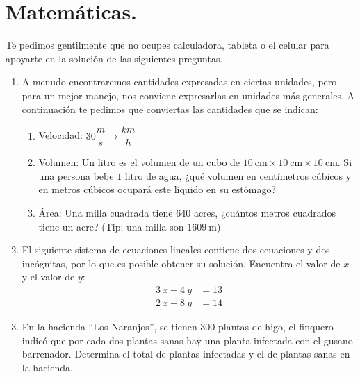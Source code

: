 \documentclass[12pt]{article}
\begin{document}
\section{Matemáticas.}
Te pedimos gentilmente que no ocupes calculadora, tableta o el celular para apoyarte en la solución de las siguientes preguntas.
\begin{enumerate}
\item A menudo encontraremos cantidades expresadas en ciertas unidades, pero para un mejor manejo, nos conviene expresarlas en unidades más generales. A continuación te pedimos que conviertas las cantidades que se indican:
\begin{enumerate}
    \item Velocidad: $30 \dfrac{m}{s} \rightarrow \dfrac{km}{h}$
    \item Volumen: Un litro es el volumen de un cubo de $ \SI{10}{\centi\metre} \times \SI{10}{\centi\metre} \times \SI{10}{\centi\metre}$. Si una persona bebe $1$ litro de agua, ¿qué volumen en centímetros cúbicos y en metros cúbicos ocupará este líquido en su estómago?
    \item Área: Una milla cuadrada tiene $640$ acres, ¿cuántos metros cuadrados tiene un acre? (Tip: una milla son $\SI{1609}{\meter}$)
\end{enumerate}
\item El siguiente sistema de ecuaciones lineales contiene dos ecuaciones y dos incógnitas, por lo que es posible obtener su solución. Encuentra el valor de $x$ y el valor de $y$:
\begin{align*}
3 \: x + 4 \: y &= 13 \\
2 \: x + 8 \: y &= 14
\end{align*}
\item En la hacienda \enquote{Los Naranjos}, se tienen 300 plantas de higo, el finquero indicó que por cada dos plantas sanas hay una planta infectada con el gusano barrenador. Determina el total de plantas infectadas y el de plantas sanas en la hacienda.

\end{enumerate}
\end{document}
